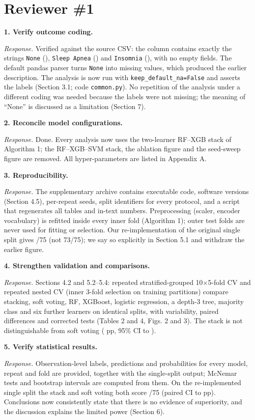 \documentclass[11pt,a4paper]{article}
\newcommand{\rc}[1]{\par\smallskip\noindent\textbf{#1}\par}
\newcommand{\ans}{\noindent\textit{Response.} }
\begin{document}
\section*{Reviewer \#1}
\rc{1. Verify outcome coding.}\ans Verified against the source CSV: the column contains exactly the strings \texttt{None} (\NNone), \texttt{Sleep Apnea} (\NApn) and \texttt{Insomnia} (\NIns), with no empty fields. The default pandas parser turns \texttt{None} into missing values, which produced the earlier description. The analysis is now run with \texttt{keep\_default\_na=False} and asserts the labels (Section 3.1; code \texttt{common.py}). No repetition of the analysis under a different coding was needed because the labels were not missing; the meaning of ``None'' is discussed as a limitation (Section 7).
\rc{2. Reconcile model configurations.}\ans Done. Every analysis now uses the two-learner RF--XGB stack of Algorithm 1; the RF--XGB--SVM stack, the ablation figure and the seed-sweep figure are removed. All hyper-parameters are listed in Appendix A.
\rc{3. Reproducibility.}\ans The supplementary archive contains executable code, software versions (Section 4.5), per-repeat seeds, split identifiers for every protocol, and a script that regenerates all tables and in-text numbers. Preprocessing (scaler, encoder vocabulary) is refitted inside every inner fold (Algorithm 1); outer test folds are never used for fitting or selection. Our re-implementation of the original single split gives \OrigStackCorrect/75 (not 73/75); we say so explicitly in Section 5.1 and withdraw the earlier figure.
\rc{4. Strengthen validation and comparisons.}\ans Sections 4.2 and 5.2--5.4: repeated stratified-grouped 10$\times$5-fold CV and repeated nested CV (inner 3-fold selection on training partitions) compare stacking, soft voting, RF, XGBoost, logistic regression, a depth-3 tree, majority class and six further learners on identical splits, with variability, paired differences and corrected tests (Tables 2 and 4, Figs. 2 and 3). The stack is not distinguishable from soft voting (\DiffVoteG{} pp, 95\% CI \DiffLoVoteG{} to \DiffHiVoteG).
\rc{5. Verify statistical results.}\ans Observation-level labels, predictions and probabilities for every model, repeat and fold are provided, together with the single-split output; McNemar tests and bootstrap intervals are computed from them. On the re-implemented single split the stack and soft voting both score \OrigStackCorrect/75 (paired CI \OrigBootLo{} to \OrigBootHi{} pp). Conclusions now consistently state that there is no evidence of superiority, and the discussion explains the limited power (Section 6).
\end{document}
